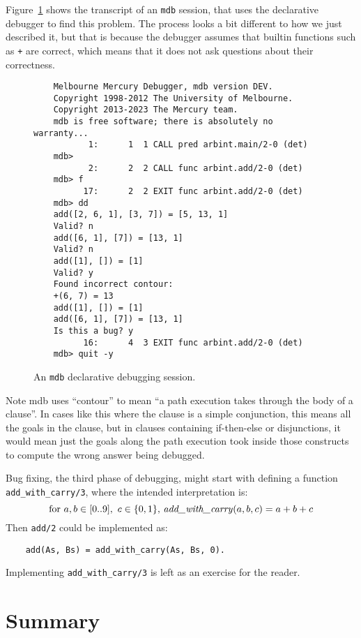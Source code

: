 Figure~\ref{fig:dd-session} shows
the transcript of an \texttt{mdb} session,
that uses the declarative debugger to find this problem.
The process looks a bit different to how we just described it,
but that is because the debugger assumes
that builtin functions such as \texttt{+} are correct,
which means that it does not ask questions about their correctness.

\begin{figure}[hb]
\begin{verbatim}
    Melbourne Mercury Debugger, mdb version DEV.
    Copyright 1998-2012 The University of Melbourne.
    Copyright 2013-2023 The Mercury team.
    mdb is free software; there is absolutely no warranty...
           1:      1  1 CALL pred arbint.main/2-0 (det)
    mdb>
           2:      2  2 CALL func arbint.add/2-0 (det)
    mdb> f
          17:      2  2 EXIT func arbint.add/2-0 (det)
    mdb> dd
    add([2, 6, 1], [3, 7]) = [5, 13, 1]
    Valid? n
    add([6, 1], [7]) = [13, 1]
    Valid? n
    add([1], []) = [1]
    Valid? y
    Found incorrect contour:
    +(6, 7) = 13
    add([1], []) = [1]
    add([6, 1], [7]) = [13, 1]
    Is this a bug? y
          16:      4  3 EXIT func arbint.add/2-0 (det)
    mdb> quit -y
\end{verbatim}
\caption{
An \texttt{mdb} declarative debugging session.
\label{fig:dd-session}}
\end{figure}

Note mdb uses ``contour'' to mean
``a path execution takes through the body of a clause''.
In cases like this where the clause is a simple conjunction,
this means all the goals in the clause,
but in clauses containing if-then-else or disjunctions,
it would mean just the goals along the path execution took
inside those constructs to compute the wrong answer being debugged.

\label{end:decl-debug}

Bug fixing,
the third phase of debugging,
might start with defining a function \texttt{add\_with\_carry/3},
where the intended interpretation is:
\[
    \text{for }a, b \in [0..9],\ c \in \{0, 1\},
        \,\text{\textit{add\_with\_carry}}(a, b, c) = a + b + c
\]
Then \texttt{add/2} could be implemented as:
\begin{verbatim}
    add(As, Bs) = add_with_carry(As, Bs, 0).
\end{verbatim}
Implementing \texttt{add\_with\_carry/3}
is left as an exercise for the reader.

\section{Summary}

